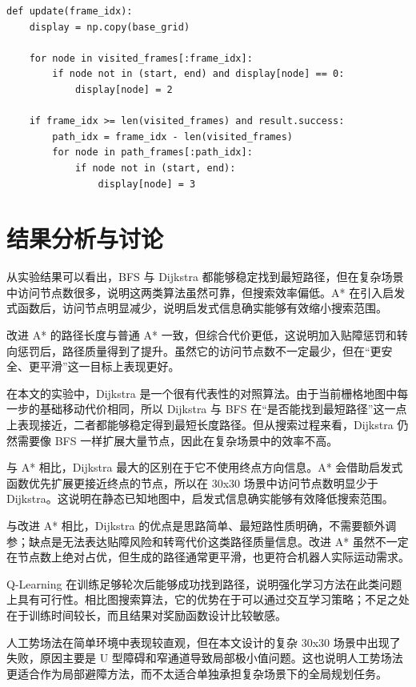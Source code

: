 \documentclass[12pt,a4paper,fontset=none]{ctexart}
\begin{document}
\begin{lstlisting}[caption={动态展示中的帧更新逻辑}]
def update(frame_idx):
    display = np.copy(base_grid)

    for node in visited_frames[:frame_idx]:
        if node not in (start, end) and display[node] == 0:
            display[node] = 2

    if frame_idx >= len(visited_frames) and result.success:
        path_idx = frame_idx - len(visited_frames)
        for node in path_frames[:path_idx]:
            if node not in (start, end):
                display[node] = 3
\end{lstlisting}

\section{结果分析与讨论}

从实验结果可以看出，BFS 与 Dijkstra 都能够稳定找到最短路径，但在复杂场景中访问节点数很多，说明这两类算法虽然可靠，但搜索效率偏低。A* 在引入启发式函数后，访问节点明显减少，说明启发式信息确实能够有效缩小搜索范围。

改进 A* 的路径长度与普通 A* 一致，但综合代价更低，这说明加入贴障惩罚和转向惩罚后，路径质量得到了提升。虽然它的访问节点数不一定最少，但在“更安全、更平滑”这一目标上表现更好。

在本文的实验中，Dijkstra 是一个很有代表性的对照算法。由于当前栅格地图中每一步的基础移动代价相同，所以 Dijkstra 与 BFS 在“是否能找到最短路径”这一点上表现接近，二者都能够稳定得到最短长度路径。但从搜索过程来看，Dijkstra 仍然需要像 BFS 一样扩展大量节点，因此在复杂场景中的效率不高。

与 A* 相比，Dijkstra 最大的区别在于它不使用终点方向信息。A* 会借助启发式函数优先扩展更接近终点的节点，所以在 30x30 场景中访问节点数明显少于 Dijkstra。这说明在静态已知地图中，启发式信息确实能够有效降低搜索范围。

与改进 A* 相比，Dijkstra 的优点是思路简单、最短路性质明确，不需要额外调参；缺点是无法表达贴障风险和转弯代价这类路径质量信息。改进 A* 虽然不一定在节点数上绝对占优，但生成的路径通常更平滑，也更符合机器人实际运动需求。

Q-Learning 在训练足够轮次后能够成功找到路径，说明强化学习方法在此类问题上具有可行性。相比图搜索算法，它的优势在于可以通过交互学习策略；不足之处在于训练时间较长，而且结果对奖励函数设计比较敏感。

人工势场法在简单环境中表现较直观，但在本文设计的复杂 30x30 场景中出现了失败，原因主要是 U 型障碍和窄通道导致局部极小值问题。这也说明人工势场法更适合作为局部避障方法，而不太适合单独承担复杂场景下的全局规划任务。
\end{document}
